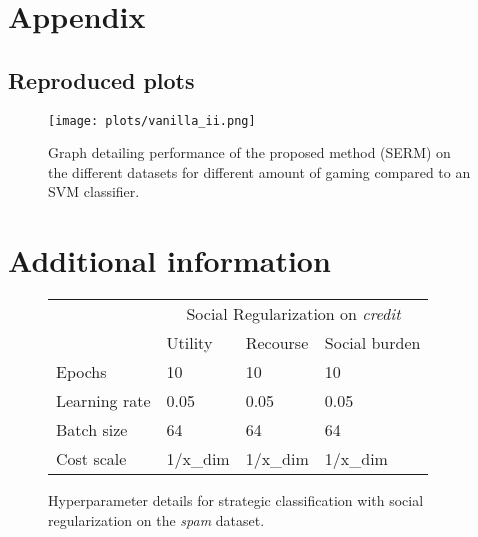 \newpage
\section*{Appendix}
\subsection{Reproduced plots}\label{app:plots}
\begin{figure}[H]
    \centering
    \texttt{[image: plots/vanilla\_ii.png]}
    \caption{Graph detailing performance of the proposed method (SERM) on the different datasets for different amount of gaming compared to an SVM classifier.}
    \label{fig:vanilla_II}
\end{figure}
\section{Additional information}
\begin{figure}[H]
    \centering
    \begin{tabular}{l|lll|}
    \cline{2-4}
                                        & \multicolumn{3}{c|}{Social Regularization on \textit{credit}}                            \\ \cline{2-4} 
                                        & \multicolumn{1}{l|}{Utility}  & \multicolumn{1}{l|}{Recourse} & Social burden \\ \hline
    \multicolumn{1}{|l|}{Epochs}        & \multicolumn{1}{l|}{10}       & \multicolumn{1}{l|}{10}       & 10            \\ \hline
    \multicolumn{1}{|l|}{Learning rate} & \multicolumn{1}{l|}{0.05}     & \multicolumn{1}{l|}{0.05}     & 0.05          \\ \hline
    \multicolumn{1}{|l|}{Batch size}    & \multicolumn{1}{l|}{64}       & \multicolumn{1}{l|}{64}       & 64            \\ \hline
    \multicolumn{1}{|l|}{Cost scale}         & \multicolumn{1}{l|}{1/x\_dim} & \multicolumn{1}{l|}{1/x\_dim} & 1/x\_dim      \\ \hline
\end{tabular}
    \caption{Hyperparameter details for strategic classification with social regularization on the \textit{spam} dataset.}
    \label{tab:hyperparams_reg}
\end{figure}
